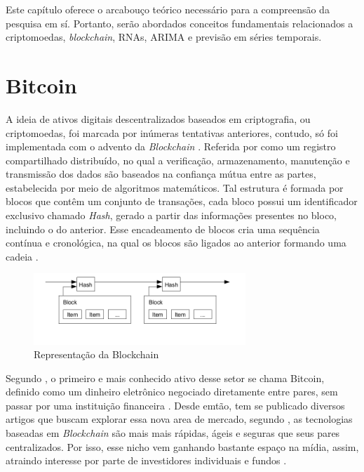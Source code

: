 
Este capítulo oferece o arcabouço teórico necessário para a compreensão da pesquisa em sí. 
Portanto, serão abordados conceitos fundamentais relacionados
a criptomoedas, \textit{blockchain}, RNAs, ARIMA e previsão em séries temporais.
\section{Bitcoin}
\label{secao:bitcoin}

A ideia de ativos digitais descentralizados baseados em criptografia, ou criptomoedas, foi marcada por inúmeras tentativas anteriores, contudo,
só foi implementada com o advento da \textit{Blockchain} \cite{Moi}. Referida por \textcite{Yuan} como um registro compartilhado distribuído, no qual a verificação, armazenamento, manutenção e transmissão dos dados são baseados na confiança mútua entre as partes, estabelecida por meio de algoritmos matemáticos.
Tal estrutura é formada por blocos que contêm um conjunto 
de transações, cada bloco possui um identificador exclusivo chamado \textit{Hash},
gerado a partir das informações presentes no bloco, incluindo o do anterior. 
Esse encadeamento de blocos cria uma sequência contínua e cronológica, na qual os blocos são ligados ao anterior formando uma cadeia \cite{Blockchain}.

\begin{figure}[!htb] \centering
  \caption{Representação da Blockchain} \label{figura:imageBlock}
  \begin{varwidth}{\linewidth}
    \includegraphics[width=8cm]{figuras/imageBlock.png}
  \end{varwidth}
\end{figure}

Segundo \textcite{Fer}, o primeiro e mais conhecido ativo desse setor se chama Bitcoin, definido como um dinheiro eletrônico negociado diretamente entre pares, sem passar por uma instituição financeira \cite{Nakamoto}.
Desde emtão, tem se publicado diversos artigos que buscam explorar essa nova area de mercado, segundo \textcite{Sousa}, as tecnologias baseadas em \textit{Blockchain} são mais mais rápidas, ágeis e seguras que seus pares centralizados. 
Por isso, esse nicho vem ganhando bastante espaço na mídia, assim, atraindo interesse por parte de investidores individuais e fundos \cite{Yuan}. 

